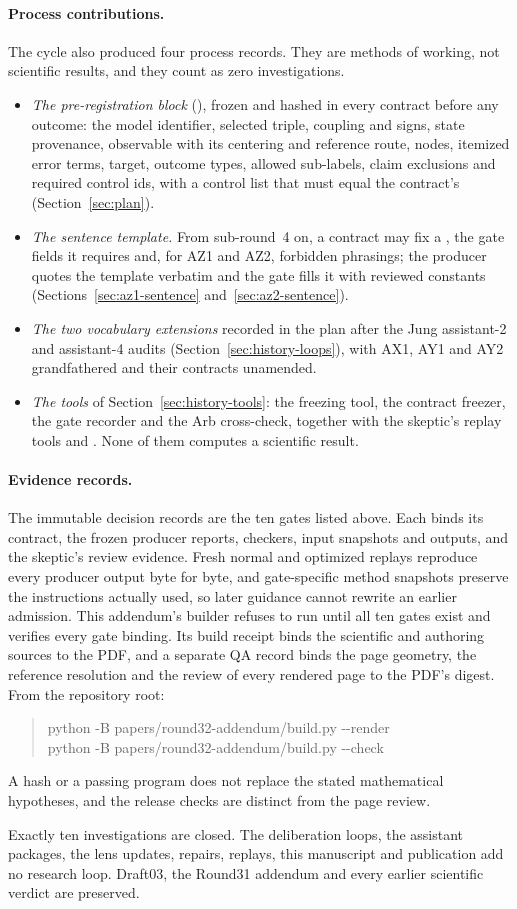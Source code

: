\paragraph{Process contributions.}
The cycle also produced four process records. They are methods of working,
not scientific results, and they count as zero investigations.
\begin{itemize}\raggedright
\item \emph{The pre-registration block} (), frozen
 and hashed in every contract before any outcome: the model identifier,
 selected triple, coupling and signs, state provenance, observable with its
 centering and reference route, nodes, itemized error terms, target, outcome
 types, allowed sub-labels, claim exclusions and required control ids, with a
 control list that must equal the contract's (Section~\ref{sec:plan}).
\item \emph{The sentence template.} From sub-round~4 on, a contract may fix a
 , the gate fields it requires and, for
 AZ1 and AZ2, forbidden phrasings; the producer quotes the template verbatim
 and the gate fills it with reviewed constants
 (Sections~\ref{sec:az1-sentence} and~\ref{sec:az2-sentence}).
\item \emph{The two vocabulary extensions} recorded in the plan after the
 Jung assistant-2 and assistant-4 audits (Section~\ref{sec:history-loops}),
 with AX1, AY1 and AY2 grandfathered and their contracts unamended.
\item \emph{The tools} of Section~\ref{sec:history-tools}: the freezing tool,
 the contract freezer, the gate recorder and the Arb cross-check, together
 with the skeptic's replay tools  and
 . None of them computes a scientific result.
\end{itemize}

\paragraph{Evidence records.}
The immutable decision records are the ten gates listed above. Each binds its
contract, the frozen producer reports, checkers, input snapshots and outputs,
and the skeptic's review evidence. Fresh normal and optimized replays
reproduce every producer output byte for byte, and gate-specific method
snapshots preserve the instructions actually used, so later guidance cannot
rewrite an earlier admission. This addendum's builder refuses to run until
all ten gates exist and verifies every gate binding. Its build receipt binds
the scientific and authoring sources to the PDF, and a separate QA record
binds the page geometry, the reference resolution and the review of every
rendered page to the PDF's digest. From the repository root:
\begin{quote}\small\ttfamily
python -B papers/round32-addendum/build.py -{}-render\\
python -B papers/round32-addendum/build.py -{}-check
\end{quote}
A hash or a passing program does not replace the stated mathematical
hypotheses, and the release checks are distinct from the page review.

Exactly ten investigations are closed. The deliberation loops, the assistant
packages, the lens updates, repairs, replays, this manuscript and publication
add no research loop. Draft03, the Round31 addendum and every earlier
scientific verdict are preserved.
